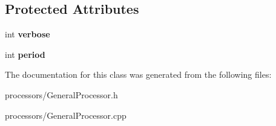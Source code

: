 \subsection*{Protected Attributes}
\begin{DoxyCompactItemize}
\item 
\hypertarget{classGeneralProcessor_ade0b12d7fec2b58a9782559734b00012}{int {\bfseries verbose}}\label{classGeneralProcessor_ade0b12d7fec2b58a9782559734b00012}

\item 
\hypertarget{classGeneralProcessor_a064234fe7c1400b0be5247db444367d1}{int {\bfseries period}}\label{classGeneralProcessor_a064234fe7c1400b0be5247db444367d1}

\end{DoxyCompactItemize}


The documentation for this class was generated from the following files\-:\begin{DoxyCompactItemize}
\item 
processors/General\-Processor.\-h\item 
processors/General\-Processor.\-cpp\end{DoxyCompactItemize}
